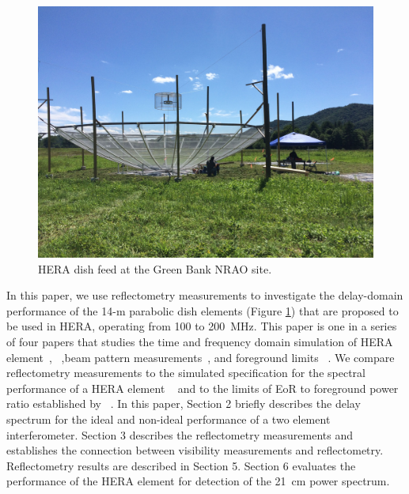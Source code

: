 \documentclass[twocolumn]{emulateapj}
\begin{document}
    \begin{figure}
    \centering
    \includegraphics[trim={2cm 20cm 30cm 15cm},clip, totalheight=0.3\textheight]{plots/heradish.jpg}
    \caption{HERA dish feed at the Green Bank NRAO site.}
    \label{fig:heradish}
    \end{figure}
    

    In this paper, we use reflectometry measurements to
    investigate the delay-domain performance of 
    the 14-m parabolic dish elements (Figure \ref{fig:heradish}) that are proposed to be used in HERA, operating 
    from 100 to 200~MHz.
    This paper is one in a series of four papers that studies the time and frequency domain simulation of  HERA element~\citep{Ewall-Wice_et_al2016}, ~\citep{ddboer_et_al2016},beam pattern measurements~\citep{Neben_et_al2016}, and foreground limits ~\citep{Thyagarajan_et_al2016}. We compare 
    reflectometry measurements to the simulated specification for the spectral performance of a HERA element ~\citep{ddboer_et_al2016} and to the limits of EoR to foreground power ratio established by ~\citep{Thyagarajan_et_al2016}. 
    In this paper, Section 2 briefly describes the delay spectrum for the ideal and
    non-ideal performance of a two element interferometer. Section 3 describes the
    reflectometry measurements and establishes the connection between visibility
    measurements and reflectometry. Reflectometry results are described in Section
    5. Section 6 evaluates the performance of the HERA element for detection of the
    21~cm power spectrum.
    
\end{document}
